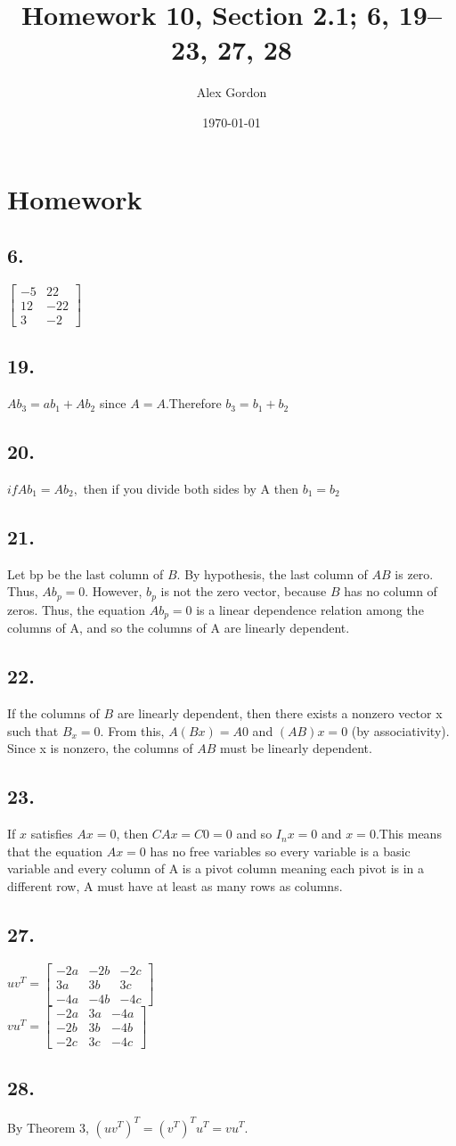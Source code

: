 \documentclass[12]{scrartcl}
\begin{document}
\title{Homework 10, Section 2.1; 6, 19–23, 27, 28
 }
\author{Alex Gordon}
\date{\today}
\maketitle
\section*{Homework}
\subsection*{6.}
$\begin{bmatrix} -5&22 \\ 12&-22 \\ 3&-2   \end{bmatrix}$\\
\subsection*{19.}
$ Ab_3 = ab_1 + Ab_2 $ since $A = A.$Therefore $b_3 = b_1 + b_2$
\subsection*{20.}
$if Ab_1 = Ab_2, $ then if you divide both sides by A then $b_1 = b_2$
\subsection*{21.}
Let bp be the last column of $B$. By hypothesis, the last column of $AB$ is zero. Thus, $Ab_p = 0$. However, $b_p$ is not the zero vector, because $B$ has no column of zeros. Thus, the equation $Ab_p = 0$ is a linear dependence relation among the columns of A, and so the columns of A are linearly dependent.
\subsection*{22.}
If the columns of $B$ are linearly dependent, then there exists a nonzero vector x such that $B_x = 0$. From this, $A(Bx) = A0$ and $(AB)x = 0$ (by associativity). Since x is nonzero, the columns of $AB$ must be linearly dependent.
\subsection*{23.}
If $x$ satisfies $Ax=0$, then $CAx=C0=0$ and so $I_nx=0$ and $x=0$.This means that the equation $Ax=0$ has no free variables so every variable is a basic variable and every column of A is a pivot column meaning each pivot is in a different row, A must have at least as many rows as columns.
\subsection*{27.}
$uv^T = \begin{bmatrix} -2a&-2b&-2c \\ 3a&3b&3c \\ -4a&-4b&-4c   \end{bmatrix}$\\
$vu^T = \begin{bmatrix} -2a&3a&-4a \\ -2b&3b&-4b \\ -2c&3c&-4c   \end{bmatrix}$\\
\subsection*{28.}
By Theorem 3, $(uv^T)^T = (v^T)^Tu^T = vu^T.$
\end{document}
